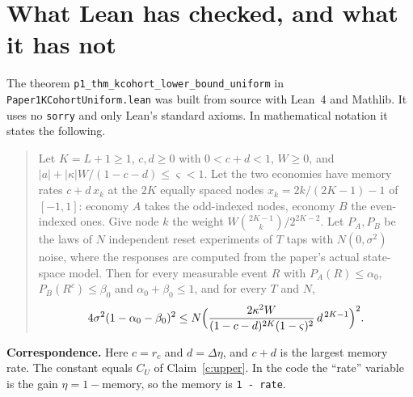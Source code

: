 \documentclass[11pt]{article}
\begin{document}
\section{What Lean has checked, and what it has not}\label{sec:lean}

The theorem \texttt{p1\_thm\_kcohort\_lower\_bound\_uniform} in \texttt{Paper1KCohortUniform.lean} was built from source with Lean~4 and Mathlib. It uses no \texttt{sorry} and only Lean's standard axioms. In mathematical notation it states the following.

\begin{quote}
Let $K=L+1\ge1$, $c,d\ge0$ with $0<c+d<1$, $W\ge0$, and $|a|+|\kappa|W/(1-c-d)\le\varsigma<1$. Let the two economies have memory rates $c+d\,x_k$ at the $2K$ equally spaced nodes $x_k=2k/(2K-1)-1$ of $[-1,1]$: economy $A$ takes the odd-indexed nodes, economy $B$ the even-indexed ones. Give node $k$ the weight $W\binom{2K-1}{k}/2^{2K-2}$. Let $P_A,P_B$ be the laws of $N$ independent reset experiments of $T$ taps with $N(0,\sigma^2)$ noise, where the responses are computed from the paper's actual state-space model. Then for every measurable event $R$ with $P_A(R)\le\alpha_0$, $P_B(R^c)\le\beta_0$ and $\alpha_0+\beta_0\le1$, and for every $T$ and $N$,
\[
4\sigma^2(1-\alpha_0-\beta_0)^2\le N\Bigl(\frac{2\kappa^2W}{(1-c-d)^{2K}(1-\varsigma)^2}\,d^{\,2K-1}\Bigr)^2 .
\]
\end{quote}

\textbf{Correspondence.} Here $c=r_c$ and $d=\Delta\eta$, and $c+d$ is the largest memory rate. The constant equals $C_U$ of Claim~\ref{c:upper}. In the code the ``rate'' variable is the gain $\eta=1-$memory, so the memory is \texttt{1 - rate}.
\end{document}
